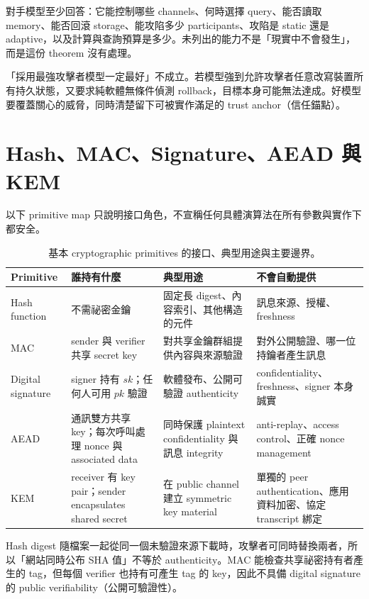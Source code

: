 \documentclass[11pt,a4paper,oneside,openany]{book}
\begin{document}
對手模型至少回答：它能控制哪些 channels、何時選擇 query、能否讀取 memory、能否回滾 storage、能攻陷多少 participants、攻陷是 static 還是 adaptive，以及計算與查詢預算是多少。未列出的能力不是「現實中不會發生」，而是這份 theorem 沒有處理。

\begin{misconception}
「採用最強攻擊者模型一定最好」不成立。若模型強到允許攻擊者任意改寫裝置所有持久狀態，又要求純軟體無條件偵測 rollback，目標本身可能無法達成。好模型要覆蓋關心的威脅，同時清楚留下可被實作滿足的 trust anchor（信任錨點）。
\end{misconception}

\section{Hash、MAC、Signature、AEAD 與 KEM}
以下 primitive map 只說明接口角色，不宣稱任何具體演算法在所有參數與實作下都安全。

\begin{table}[htbp]
\centering
\caption{基本 cryptographic primitives 的接口、典型用途與主要邊界。}
\label{tab:primitive-map}
\begin{tabularx}{\textwidth}{@{}>{\raggedright\arraybackslash}p{}>{\raggedright\arraybackslash}p{}YY@{}}
\toprule
Primitive & 誰持有什麼 & 典型用途 & 不會自動提供 \\
\midrule
Hash function & 不需祕密金鑰 & 固定長 digest、內容索引、其他構造的元件 & 訊息來源、授權、freshness \\
MAC & sender 與 verifier 共享 secret key & 對共享金鑰群組提供內容與來源驗證 & 對外公開驗證、哪一位持鑰者產生訊息 \\
Digital signature & signer 持有 $sk$；任何人可用 $pk$ 驗證 & 軟體發布、公開可驗證 authenticity & confidentiality、freshness、signer 本身誠實 \\
AEAD & 通訊雙方共享 key；每次呼叫處理 nonce 與 associated data & 同時保護 plaintext confidentiality 與訊息 integrity & anti-replay、access control、正確 nonce management \\
KEM & receiver 有 key pair；sender encapsulates shared secret & 在 public channel 建立 symmetric key material & 單獨的 peer authentication、應用資料加密、協定 transcript 綁定 \\
\bottomrule
\end{tabularx}
\end{table}

Hash digest 隨檔案一起從同一個未驗證來源下載時，攻擊者可同時替換兩者，所以「網站同時公布 SHA 值」不等於 authenticity。MAC 能檢查共享祕密持有者產生的 tag，但每個 verifier 也持有可產生 tag 的 key，因此不具備 digital signature 的 public verifiability（公開可驗證性）。
\end{document}
